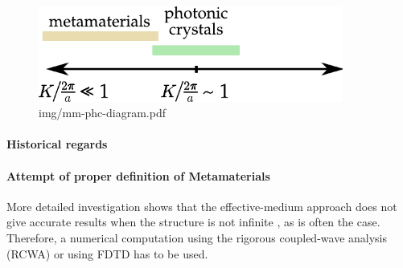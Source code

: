 \begin{figure} \caption{img/mm-phc-diagram.pdf}  \centering \includegraphics[width=10cm]{img/mm-phc-diagram.pdf} \end{figure} \clearpage


\paragraph{Historical regards}
\paragraph{Attempt of proper definition of Metamaterials}
\cite{richter1995}
\cite{kadlec2008}

More detailed investigation shows that the effective-medium approach does not give accurate results when the structure is not infinite \cite{richter1995}, as is often the case. Therefore, a numerical computation using the rigorous coupled-wave analysis (RCWA) or using FDTD has to be used.






